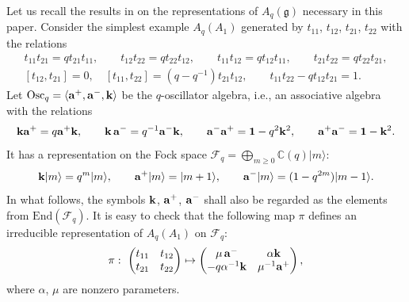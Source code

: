 Let us recall the results in \cite{So2, VS}
on the representations of $A_q(\mathfrak{g})$
necessary in this paper.
Consider the simplest example $A_q(A_1)$ generated by
$t_{11}$, $t_{12}$, $t_{21}$, $t_{22}$
with the relations
\begin{gather*}
t_{11}t_{21} = qt_{21}t_{11},\qquad
t_{12}t_{22} = qt_{22}t_{12},\qquad
t_{11}t_{12} = qt_{12}t_{11},\qquad
t_{21}t_{22} = qt_{22}t_{21},\\
[t_{12},t_{21}]=0,\quad [t_{11},t_{22}]=(q-q^{-1})t_{21}t_{12},
\qquad t_{11}t_{22}-qt_{12}t_{21}=1.
\end{gather*}
Let $\mathrm{Osc}_q =
\langle  {\rm{\bf a}}^+, {\rm{\bf a}}^-, {\rm{\bf k}} \rangle$
be the $q$-oscillator algebra, i.e.,
an associative algebra with the relations
\begin{gather}\label{a:qoa}
{\rm{\bf k}}  {\rm{\bf a}}^+ = q {\rm{\bf a}}^+{\rm{\bf k}},\qquad
{\rm{\bf k}}\,{\rm{\bf a}}^- = q^{-1}{\rm{\bf a}}^-{\rm{\bf k}},\qquad
{\rm{\bf a}}^- {\rm{\bf a}}^+ = {\bf 1}-q^2{\rm{\bf k}}^2,\qquad
{\rm{\bf a}}^+{\rm{\bf a}}^- = {\bf 1}-{\rm{\bf k}}^2.
\end{gather}
It has a representation on
the Fock space
$\mathcal{F}_q = \bigoplus_{m\ge 0}{\mathbb C}(q)|m\rangle$:
\begin{gather}\label{a:akf}
{\rm{\bf k}}|m\rangle = q^m |m\rangle,\qquad
{\rm{\bf a}}^+|m\rangle = |m+1\rangle,\qquad
{\rm{\bf a}}^-|m\rangle = (1-q^{2m})|m-1\rangle.
\end{gather}
In what follows, the symbols
${\rm{\bf k}}$, ${\rm{\bf a}}^+$, ${\rm{\bf a}}^-$ shall
also be regarded as the elements from $\mathrm{End}(\mathcal{F}_q)$.
It is easy to check that the following map $\pi$
def\/ines an irreducible representation of
$A_q(A_1)$ on $\mathcal{F}_q$:
\begin{gather}\label{a:pisl2}
\pi:  \ \begin{pmatrix}
t_{11} & t_{12}\\
t_{21} & t_{22}
\end{pmatrix} \mapsto
\begin{pmatrix}
\mu\,{\rm {\bf a}}^- &  \alpha {\rm {\bf k}}\\
-q\alpha^{-1}{\rm {\bf k}} & \mu^{-1}{\rm {\bf a}}^+
\end{pmatrix},
\end{gather}
where $\alpha$, $\mu$ are nonzero parameters.

